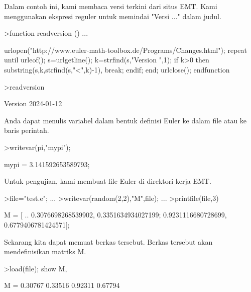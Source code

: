 \documentclass[a4paper,10pt]{article}
\begin{document}
\begin{eulernotebook}
\begin{eulercomment}
Dalam contoh ini, kami membaca versi terkini dari situs EMT. Kami
menggunakan ekspresi reguler untuk memindai "Versi ..." dalam judul.
\end{eulercomment}
\begin{eulerprompt}
>function readversion () ...
\end{eulerprompt}
\begin{eulerudf}
  urlopen("http://www.euler-math-toolbox.de/Programs/Changes.html");
  repeat
    until urleof();
    s=urlgetline();
    k=strfind(s,"Version ",1);
    if k>0 then substring(s,k,strfind(s,"<",k)-1), break; endif;
  end;
  urlclose();
  endfunction
\end{eulerudf}
\begin{eulerprompt}
>readversion
\end{eulerprompt}
\begin{euleroutput}
  Version 2024-01-12
\end{euleroutput}
\begin{eulercomment}
Anda dapat menulis variabel dalam bentuk definisi Euler ke dalam file
atau ke baris perintah.
\end{eulercomment}
\begin{eulerprompt}
>writevar(pi,"mypi");
\end{eulerprompt}
\begin{euleroutput}
  mypi = 3.141592653589793;
\end{euleroutput}
\begin{eulercomment}
Untuk pengujian, kami membuat file Euler di direktori kerja EMT.
\end{eulercomment}
\begin{eulerprompt}
>file="test.e"; ...
>writevar(random(2,2),"M",file); ...
>printfile(file,3)
\end{eulerprompt}
\begin{euleroutput}
  M = [ ..
  0.3076698268539902, 0.3351634934027199;
  0.9231116680728699, 0.6779406781424571];
\end{euleroutput}
\begin{eulercomment}
Sekarang kita dapat memuat berkas tersebut. Berkas tersebut akan
mendefinisikan matriks M.
\end{eulercomment}
\begin{eulerprompt}
>load(file); show M,
\end{eulerprompt}
\begin{euleroutput}
  M = 
    0.30767   0.33516 
    0.92311   0.67794 
\end{euleroutput}

\end{eulernotebook}
\end{document}
